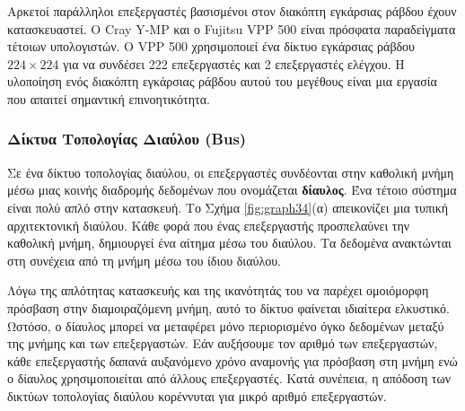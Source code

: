 \documentclass[12pt,a4paper]{article} %
\begin{document}
Αρκετοί παράλληλοι επεξεργαστές βασισμένοι στον διακόπτη
εγκάρσιας ράβδου έχουν κατασκευαστεί. Ο
Cray Y-MP και ο
Fujitsu VPP 500 είναι πρόσφατα παραδείγματα τέτοιων
υπολογιστών. Ο VPP 500 χρησιμοποιεί ένα δίκτυο
εγκάρσιας ράβδου $224 \times 224$ για να συνδέσει 222
επεξεργαστές και 2 επεξεργαστές ελέγχου. Η υλοποίηση ενός διακόπτη
εγκάρσιας ράβδου αυτού του μεγέθους είναι μια εργασία που
απαιτεί σημαντική επινοητικότητα.

\subsubsection{Δίκτυα Τοπολογίας Διαύλου (Bus)}
\begin{sloppypar}
Σε ένα δίκτυο τοπολογίας διαύλου, οι επεξεργαστές
συνδέονται στην καθολική μνήμη μέσω μιας κοινής διαδρομής δεδομένων που ονομάζεται
\textbf{δίαυλος}. Ένα τέτοιο σύστημα είναι πολύ απλό στην
κατασκευή. Το Σχήμα \ref{fig:graph34}(α) απεικονίζει μια τυπική αρχιτεκτονική
διαύλου. Κάθε φορά που ένας επεξεργαστής προσπελαύνει την
καθολική μνήμη, δημιουργεί ένα αίτημα μέσω του διαύλου. Τα
δεδομένα ανακτώνται στη συνέχεια από τη μνήμη μέσω του ίδιου
διαύλου.
\end{sloppypar}

Λόγω της απλότητας κατασκευής και της ικανότητάς του να παρέχει ομοιόμορφη
πρόσβαση στην διαμοιραζόμενη μνήμη, αυτό το δίκτυο φαίνεται ιδιαίτερα ελκυστικό. Ωστόσο,
ο δίαυλος μπορεί να μεταφέρει μόνο περιορισμένο όγκο
δεδομένων μεταξύ της μνήμης και των επεξεργαστών. Εάν αυξήσουμε τον αριθμό των
επεξεργαστών, κάθε επεξεργαστής δαπανά αυξανόμενο χρόνο αναμονής για πρόσβαση
στη μνήμη ενώ ο δίαυλος χρησιμοποιείται από άλλους επεξεργαστές. Κατά συνέπεια, η 
απόδοση των δικτύων τοπολογίας διαύλου κορέννυται για μικρό αριθμό 
επεξεργαστών.
\end{document}
